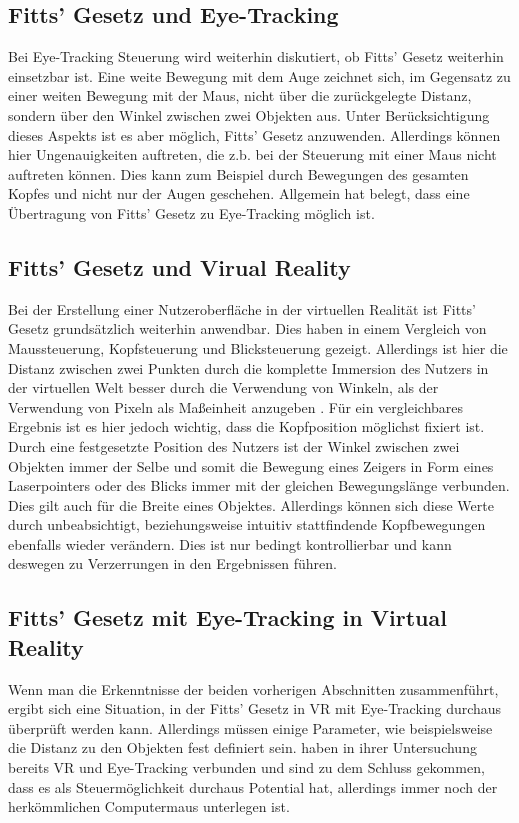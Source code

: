 \subsection{Fitts' Gesetz und Eye-Tracking}
Bei Eye-Tracking Steuerung wird weiterhin  diskutiert, ob Fitts' Gesetz weiterhin einsetzbar ist. Eine weite Bewegung mit dem Auge zeichnet sich, im Gegensatz zu einer weiten Bewegung mit der Maus, nicht über die zurückgelegte Distanz, sondern über den Winkel zwischen zwei Objekten aus. Unter Berücksichtigung dieses Aspekts ist es aber möglich, Fitts' Gesetz anzuwenden. Allerdings können hier Ungenauigkeiten auftreten, die z.b. bei der Steuerung mit einer Maus nicht auftreten können. Dies kann zum Beispiel durch Bewegungen des gesamten Kopfes und nicht nur der Augen geschehen. Allgemein hat \citeauthor{Miniotas.2000} belegt, dass eine Übertragung von Fitts' Gesetz zu Eye-Tracking möglich ist. \cite{Miniotas.2000} 

\subsection{Fitts' Gesetz und Virual Reality}
Bei der Erstellung einer Nutzeroberfläche in der virtuellen Realität ist Fitts' Gesetz grundsätzlich weiterhin anwendbar. Dies haben \citeauthor{Hansen.2018} in einem Vergleich von Maussteuerung, Kopfsteuerung und Blicksteuerung gezeigt.\cite{Hansen.2018} Allerdings ist hier die Distanz zwischen zwei Punkten durch die komplette Immersion des Nutzers in der virtuellen Welt besser durch die Verwendung von Winkeln, als der Verwendung von Pixeln als Maßeinheit anzugeben \cite{Hansen.2018}. Für ein vergleichbares Ergebnis ist es hier jedoch wichtig, dass die Kopfposition möglichst fixiert ist. Durch eine festgesetzte Position des Nutzers ist der Winkel zwischen zwei Objekten immer der Selbe und somit die Bewegung eines Zeigers in Form eines Laserpointers oder des Blicks immer mit der gleichen Bewegungslänge verbunden. Dies gilt auch für die Breite eines Objektes. Allerdings können sich diese Werte durch unbeabsichtigt, beziehungsweise intuitiv stattfindende Kopfbewegungen ebenfalls wieder verändern. Dies ist nur bedingt kontrollierbar und kann deswegen zu Verzerrungen in den Ergebnissen führen. 

\subsection{Fitts' Gesetz mit Eye-Tracking in Virtual Reality}
Wenn man die Erkenntnisse der beiden vorherigen Abschnitten zusammenführt, ergibt sich eine Situation, in der Fitts' Gesetz in VR mit Eye-Tracking durchaus überprüft werden kann. Allerdings müssen einige Parameter, wie beispielsweise die Distanz zu den Objekten fest definiert sein. \citeauthor{Hansen.2018} haben in ihrer Untersuchung bereits VR und Eye-Tracking verbunden und sind zu dem Schluss gekommen, dass es als Steuermöglichkeit durchaus Potential hat, allerdings immer noch der herkömmlichen Computermaus unterlegen ist. \cite{Hansen.2018}


